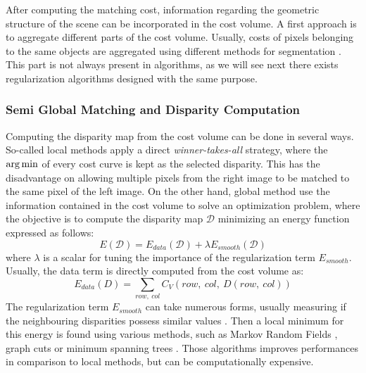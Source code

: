 After computing the matching cost, information regarding the geometric structure of the scene can be incorporated in the cost volume. A first approach is to aggregate different parts of the cost volume. Usually, costs of pixels belonging to the same objects are aggregated using different methods for segmentation \cite{ke_zhang_cross-based_2009, ji_superpixel_2021}. This part is not always present in algorithms, as we will see next there exists regularization algorithms designed with the same purpose. 

\subsubsection{Semi Global Matching and Disparity Computation}
Computing the disparity map from the cost volume can be done in several ways. So-called local methods apply a direct \textit{winner-takes-all} strategy, where the $\operatorname*{arg\,min}$ of every cost curve is kept as the selected disparity. This has the disadvantage on allowing multiple pixels from the right image to be matched to the same pixel of the left image. On the other hand, global method use the information contained in the cost volume to solve an optimization problem, where the objective is to compute the disparity map $\mathcal{D}$ minimizing an energy function expressed as follows:
\begin{equation}
    E(\mathcal{D}) = E_{data}(\mathcal{D}) + \lambda E_{smooth}(\mathcal{D})
\end{equation}
where $\lambda$ is a scalar for tuning the importance of the regularization term $E_{smooth}$. Usually, the data term is directly computed from the cost volume as:
\begin{equation}\label{eq:global_methods}
    E_{data}(D) = \sum_{row,~col}C_V(row, ~col,~D(row, ~col))
\end{equation}
The regularization term $E_{smooth}$ can take numerous forms, usually measuring if the neighbouring disparities possess similar values \cite{scharstein_taxonomy_2001}. Then a local minimum for this energy is found using various methods, such as Markov Random Fields \cite{boykov_markov_1998, sun_stereo_2003}, graph cuts \cite{kolmogorov_computing_2001} or minimum spanning trees \cite{zureiki_stereo_2008, qingxiong_yang_non-local_2012}. Those algorithms improves performances in comparison to local methods, but can be computationally expensive.

